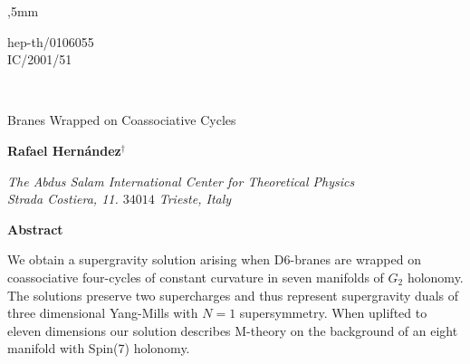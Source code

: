 \documentclass[12pt,a4paper]{article}
\begin{document}
,5mm


\def\II{\relax{\rm 1\kern-.35em1}}
\def\IP{\relax{\rm I\kern-.18em P}}
\def\muh{\hat \mu}
\def\nuh{\hat \nu}
\def\rhoh{\hat \rho}
\def\lambdah{\hat \lambda}
\def\sigmah{\hat \sigma}
\def\tauh{\hat \tau}

\begin{flushright}
hep-th/0106055 \\
IC/2001/51
\end{flushright}

\begin{center}

{}~\vfill

{ {\LARGE {Branes Wrapped on Coassociative Cycles}}}

\vspace{20 mm}


{\bf{\large{Rafael Hern\'{a}ndez}}}$^{\dag}$

\vspace{8 mm}

{\em The Abdus Salam International Center for Theoretical Physics \\
Strada Costiera, 11. $34014$ Trieste, Italy}
\vspace{16 mm}

\end{center}



\begin{center}
{\bf Abstract}
\end{center}
  
\vspace{2 mm}
  
We obtain a supergravity solution arising when D6-branes are wrapped on 
coassociative four-cycles of constant curvature in seven manifolds of $G_2$ holonomy. 
The solutions preserve two supercharges and thus represent supergravity duals of 
three dimensional Yang-Mills with $N=1$ supersymmetry. When uplifted to eleven 
dimensions our solution describes M-theory on the background of an eight manifold 
with Spin(7) holonomy.

\vspace{42 mm}

{\footnotesize \dag}
\end{document}
